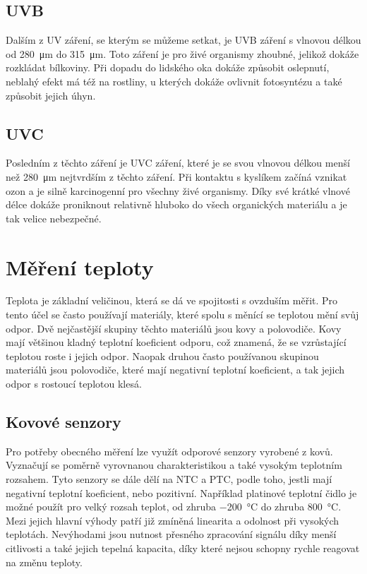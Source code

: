 \subsection{UVB}

Dalším z UV záření, se kterým se můžeme setkat, je UVB záření s vlnovou délkou od \SI{280}{\micro\metre} do \SI{315}{\micro\metre}. Toto záření je pro živé organismy zhoubné, jelikož dokáže rozkládat bílkoviny. Při dopadu do lidského oka dokáže způsobit oslepnutí, neblahý efekt má též na rostliny, u kterých dokáže ovlivnit fotosyntézu a také způsobit jejich úhyn.

\subsection{UVC}

Posledním z těchto záření je UVC záření, které je se svou vlnovou délkou menší než \SI{280}{\micro\metre} nejtvrdším z těchto záření. Při kontaktu s kyslíkem začíná vznikat ozon a je silně karcinogenní pro všechny živé organismy. Díky své krátké vlnové délce dokáže proniknout relativně hluboko do všech organických materiálu a je tak velice nebezpečné.

\section{Měření teploty}

Teplota je základní veličinou, která se dá ve spojitosti s ovzduším měřit. Pro tento účel se často používají materiály, které spolu s měnící se teplotou mění svůj odpor. Dvě nejčastější skupiny těchto materiálů jsou kovy a polovodiče. Kovy mají většinou kladný teplotní koeficient odporu, což znamená, že se vzrůstající teplotou roste i jejich odpor. Naopak druhou často používanou skupinou materiálů jsou polovodiče, které mají negativní teplotní koeficient, a tak jejich odpor s rostoucí teplotou klesá.

\subsection{Kovové senzory}

Pro potřeby obecného měření lze využít odporové senzory vyrobené z kovů. Vyznačují se poměrně vyrovnanou charakteristikou a také vysokým teplotním rozsahem. Tyto senzory se dále dělí na NTC a PTC, podle toho, jestli mají negativní teplotní koeficient, nebo pozitivní. Například platinové teplotní čidlo je možné použít pro velký rozsah teplot, od zhruba \SI{-200}{\celsius} do zhruba \SI{800}{\celsius}. Mezi jejich hlavní výhody patří již zmíněná linearita a odolnost při vysokých teplotách. Nevýhodami jsou nutnost přesného zpracování signálu díky menší citlivosti a také jejich tepelná kapacita, díky které nejsou schopny rychle reagovat na změnu teploty.


